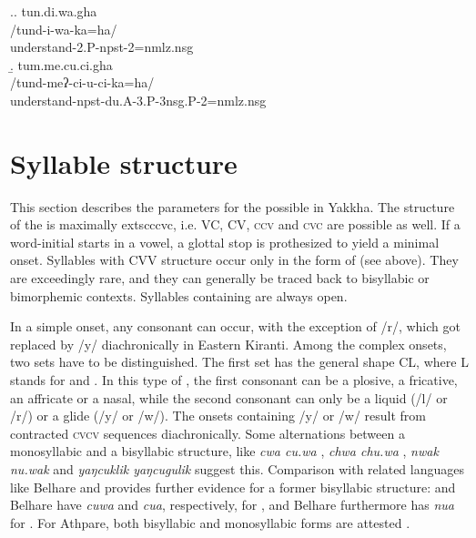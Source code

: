 \ex.\a. \glll tun.di.wa.gha\\
/tund-i-wa-ka=ha/\\
understand{\sc [3A]-2.P-npst-2=nmlz.nsg}\\
\b. \glll tum.me.cu.ci.gha\\
/tund-meʔ-ci-u-ci-ka=ha/\\
understand{\sc -npst-du.A-3.P-3nsg.P-2=nmlz.nsg}\\



\section{Syllable structure}\label{syllable}

This section describes the parameters for the possible  in Yakkha. The structure of the  is maximally 	extsc{ccvc}, i.e. VC, CV,  \textsc{ccv} and \textsc{cvc} are possible as well. If a word-initial  starts in a vowel, a glottal stop is prothesized to yield a minimal onset. Syllables with CVV structure occur only in the form of  (see  above). They are exceedingly rare, and they can generally be traced back to bisyllabic or bimorphemic contexts. Syllables containing  are always open. 

In a simple onset, any consonant can occur, with the exception of  /r/, which got replaced by /y/ diachronically in Eastern Kiranti. Among the complex onsets, two sets have to be distinguished. The first set has the general shape CL, where L stands for   and . In this type of , the first consonant can be a plosive, a fricative, an affricate or a nasal, while the second consonant can only be a liquid (/l/ or /r/) or a glide (/y/ or /w/). The onsets containing /y/ or /w/ result from contracted \textsc{cvcv} sequences diachronically. Some alternations between a monosyllabic and a bisyllabic structure, like \emph{cwa \ti cu.wa} , \emph{chwa \ti chu.wa} , \emph{nwak \ti nu.wak}  and \emph{yaŋcuklik \ti yaŋcugulik}  suggest this. Comparison with related languages like Belhare and  provides further evidence for a former bisyllabic structure:  and Belhare have \emph{cuwa} and \emph{cua}, respectively, for , and Belhare furthermore has \emph{nua} for  \citep{Bickel1997Dictionary, Raietal2011_Chintangdict}. For Athpare, both bisyllabic and monosyllabic forms are attested \citep{Ebert1997A-grammar}.

